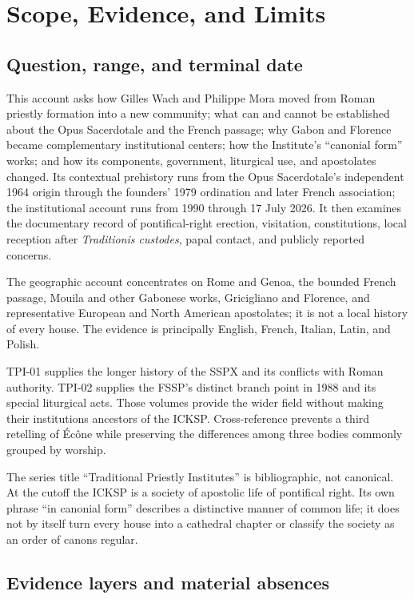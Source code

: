 \section{Scope, Evidence, and Limits}

\subsection{Question, range, and terminal date}

This account asks how Gilles Wach and Philippe Mora moved from Roman priestly formation into a new community; what can and cannot be established about the Opus Sacerdotale and the French passage; why Gabon and Florence became complementary institutional centers; how the Institute's ``canonial form'' works; and how its components, government, liturgical use, and apostolates changed. Its contextual prehistory runs from the Opus Sacerdotale's independent 1964 origin through the founders' 1979 ordination and later French association; the institutional account runs from 1990 through 17 July 2026. It then examines the documentary record of pontifical-right erection, visitation, constitutions, local reception after \emph{Traditionis custodes}, papal contact, and publicly reported concerns.

The geographic account concentrates on Rome and Genoa, the bounded French passage, Mouila and other Gabonese works, Gricigliano and Florence, and representative European and North American apostolates; it is not a local history of every house. The evidence is principally English, French, Italian, Latin, and Polish.

TPI-01 supplies the longer history of the SSPX and its conflicts with Roman authority. TPI-02 supplies the FSSP's distinct branch point in 1988 and its special liturgical acts. Those volumes provide the wider field without making their institutions ancestors of the ICKSP. Cross-reference prevents a third retelling of Écône while preserving the differences among three bodies commonly grouped by worship.

The series title ``Traditional Priestly Institutes'' is bibliographic, not canonical. At the cutoff the ICKSP is a society of apostolic life of pontifical right. Its own phrase ``in canonial form'' describes a distinctive manner of common life; it does not by itself turn every house into a cathedral chapter or classify the society as an order of canons regular.

\subsection{Evidence layers and material absences}

